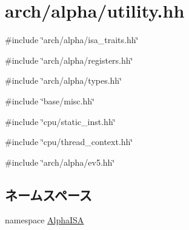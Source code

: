 \hypertarget{alpha_2utility_8hh}{
\section{arch/alpha/utility.hh}
\label{alpha_2utility_8hh}
}
{\ttfamily \#include \char`\"{}arch/alpha/isa\_\-traits.hh\char`\"{}}\par
{\ttfamily \#include \char`\"{}arch/alpha/registers.hh\char`\"{}}\par
{\ttfamily \#include \char`\"{}arch/alpha/types.hh\char`\"{}}\par
{\ttfamily \#include \char`\"{}base/misc.hh\char`\"{}}\par
{\ttfamily \#include \char`\"{}cpu/static\_\-inst.hh\char`\"{}}\par
{\ttfamily \#include \char`\"{}cpu/thread\_\-context.hh\char`\"{}}\par
{\ttfamily \#include \char`\"{}arch/alpha/ev5.hh\char`\"{}}\par
\subsection*{ネームスペース}
\begin{DoxyCompactItemize}
\item 
namespace \hyperlink{namespaceAlphaISA}{AlphaISA}
\end{DoxyCompactItemize}
